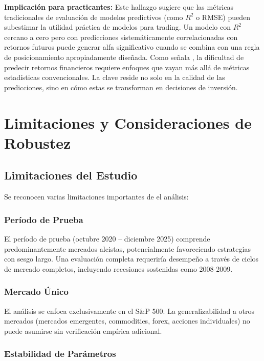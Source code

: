 \documentclass[11pt,a4paper]{article}
\begin{document}
\textbf{Implicación para practicantes:} Este hallazgo sugiere que las métricas tradicionales de evaluación de modelos predictivos (como $R^2$ o RMSE) pueden subestimar la utilidad práctica de modelos para trading. Un modelo con $R^2$ cercano a cero pero con predicciones sistemáticamente correlacionadas con retornos futuros puede generar alfa significativo cuando se combina con una regla de posicionamiento apropiadamente diseñada. Como señala \citet{lopezdeprado2018}, la dificultad de predecir retornos financieros requiere enfoques que vayan más allá de métricas estadísticas convencionales. La clave reside no solo en la calidad de las predicciones, sino en cómo estas se transforman en decisiones de inversión.

\section{Limitaciones y Consideraciones de Robustez}

\subsection{Limitaciones del Estudio}

Se reconocen varias limitaciones importantes de el análisis:

\subsubsection{Período de Prueba}

El período de prueba (octubre 2020 -- diciembre 2025) comprende predominantemente mercados alcistas, potencialmente favoreciendo estrategias con sesgo largo. Una evaluación completa requeriría desempeño a través de ciclos de mercado completos, incluyendo recesiones sostenidas como 2008-2009.

\subsubsection{Mercado Único}

El análisis se enfoca exclusivamente en el S\&P 500. La generalizabilidad a otros mercados (mercados emergentes, commodities, forex, acciones individuales) no puede asumirse sin verificación empírica adicional.

\subsubsection{Estabilidad de Parámetros}
\end{document}

